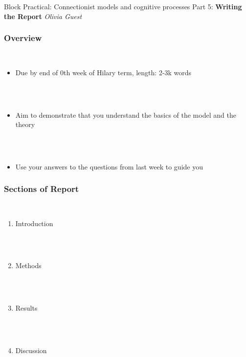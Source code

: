 \documentclass{beamer}
\begin{document}
\begin{frame}[fragile]

\centering\Huge Block Practical: Connectionist models and cognitive processes
\vfill \huge
\centering Part 5: \textbf{Writing the Report} \large
\vfill
\textit{
Olivia Guest }

\end{frame}


\begin{frame}[fragile]
\frametitle{Overview}
        \  \\

\begin{itemize}[<+->]
\item Due by end of 0th week of Hilary term, length: 2-3k words

\ \\

\ \\

 \item Aim to demonstrate that you understand the basics of the model and the theory
 
\ \\

 \ \\
 
\item Use your answers to the questions from last week to guide you


\end{itemize}


\end{frame}


\begin{frame}[fragile]
\frametitle{Sections of Report}

        \  \\

\begin{enumerate}[<+->]
\item Introduction

\ \\

\ \\

\item Methods

\ \\

\ \\

\item Results

\ \\

\ \\

\item Discussion


\end{enumerate}


\end{frame}
\end{document}
